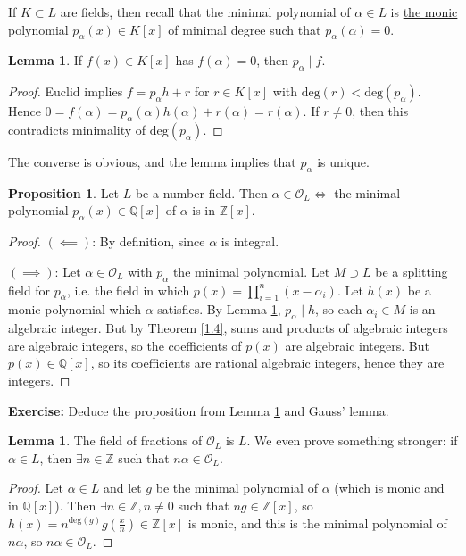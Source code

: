 \documentclass{article}
\theoremstyle{definition}
\newtheorem{lemma}[theorem]{Lemma}
\newtheorem{prop}[theorem]{Proposition}
\begin{document}
If $K \subset L$ are fields, then recall that the minimal polynomial of $\alpha \in L$ is \underline{the monic} polynomial $p_{\alpha}(x) \in K[x]$ of minimal degree such that $p_{\alpha}(\alpha)=0$.
\begin{lemma}\label{1.7}
    If $f(x) \in K[x]$ has $f(\alpha)=0$, then $p_{\alpha} \mid f$.
\end{lemma}
\begin{proof}
    Euclid implies $f=p_{\alpha} h + r$ for $r \in K[x]$ with $\text{deg}(r)<\text{deg}(p_{\alpha})$. Hence $0 = f(\alpha) = p_{\alpha}(\alpha)h(\alpha)+r(\alpha)= r(\alpha)$. If $r \neq 0$, then this contradicts minimality of $\text{deg}(p_\alpha)$.
\end{proof}
The converse is obvious, and the lemma implies that $p_{\alpha}$ is unique.
\begin{prop}
    Let $L$ be a number field. Then $\alpha \in \mathcal{O}_L \iff$ the minimal polynomial $p_{\alpha}(x) \in \mathbb{Q}[x]$ of $\alpha$ is in $\mathbb{Z}[x]$.
\end{prop}
\begin{proof}
    $(\impliedby)$: By definition, since $\alpha$ is integral.
    \vspace{1mm}
    
    $(\implies)$: Let $\alpha \in \mathcal{O}_L$ with $p_{\alpha}$ the minimal polynomial. Let $M \supset L$ be a splitting field for $p_\alpha$, i.e. the field in which $p(x)=\prod_{i=1}^{n} (x-\alpha_i)$. Let $h(x)$ be a monic polynomial which $\alpha$ satisfies. By Lemma \ref{1.7}, $p_\alpha \mid h$, so each $\alpha_i \in M$ is an algebraic integer. But by Theorem \ref{1.4}, sums and products of algebraic integers are algebraic integers, so the coefficients of $p(x)$ are algebraic integers. But $p(x) \in \mathbb{Q}[x]$, so its coefficients are rational algebraic integers, hence they are integers.
\end{proof}
\textbf{Exercise:} Deduce the proposition from Lemma \ref{1.7} and Gauss' lemma.
\begin{lemma}
    The field of fractions of $\mathcal{O}_L$ is $L$. We even prove something stronger: if $\alpha \in L$, then $\exists n \in \mathbb{Z}$ such that $n \alpha \in \mathcal{O}_L$.
\end{lemma}
\begin{proof}
    Let $\alpha \in L$ and let $g$ be the minimal polynomial of $\alpha$ (which is monic and in $\mathbb{Q}[x]$). Then $\exists n \in \mathbb{Z}, n \neq 0$ such that $ng \in \mathbb{Z}[x]$, so $h(x)=n^{\text{deg}(g)}g\left(\frac{x}{n}\right) \in \mathbb{Z}[x]$ is monic, and this is the minimal polynomial of $n \alpha$, so $n \alpha \in \mathcal{O}_L$.
\end{proof}
 
\end{document}
